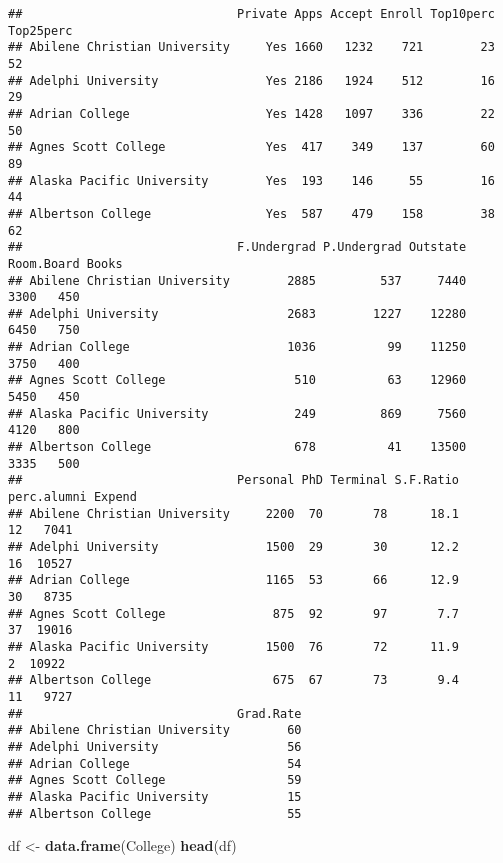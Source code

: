 \documentclass[]{article}
\newenvironment{Shaded}{\begin{snugshade}}{\end{snugshade}}
\newcommand{\KeywordTok}[1]{\textcolor[rgb]{0.13,0.29,0.53}{\textbf{#1}}}
\newcommand{\NormalTok}[1]{#1}
\newcommand{\StringTok}[1]{\textcolor[rgb]{0.31,0.60,0.02}{#1}}
\begin{document}
\begin{verbatim}
##                              Private Apps Accept Enroll Top10perc Top25perc
## Abilene Christian University     Yes 1660   1232    721        23        52
## Adelphi University               Yes 2186   1924    512        16        29
## Adrian College                   Yes 1428   1097    336        22        50
## Agnes Scott College              Yes  417    349    137        60        89
## Alaska Pacific University        Yes  193    146     55        16        44
## Albertson College                Yes  587    479    158        38        62
##                              F.Undergrad P.Undergrad Outstate Room.Board Books
## Abilene Christian University        2885         537     7440       3300   450
## Adelphi University                  2683        1227    12280       6450   750
## Adrian College                      1036          99    11250       3750   400
## Agnes Scott College                  510          63    12960       5450   450
## Alaska Pacific University            249         869     7560       4120   800
## Albertson College                    678          41    13500       3335   500
##                              Personal PhD Terminal S.F.Ratio perc.alumni Expend
## Abilene Christian University     2200  70       78      18.1          12   7041
## Adelphi University               1500  29       30      12.2          16  10527
## Adrian College                   1165  53       66      12.9          30   8735
## Agnes Scott College               875  92       97       7.7          37  19016
## Alaska Pacific University        1500  76       72      11.9           2  10922
## Albertson College                 675  67       73       9.4          11   9727
##                              Grad.Rate
## Abilene Christian University        60
## Adelphi University                  56
## Adrian College                      54
## Agnes Scott College                 59
## Alaska Pacific University           15
## Albertson College                   55
\end{verbatim}

\begin{Shaded}
\begin{Highlighting}[]
\NormalTok{df <-}\StringTok{ }\KeywordTok{data.frame}\NormalTok{(College)}
\KeywordTok{head}\NormalTok{(df)}
\end{Highlighting}
\end{Shaded}
\end{document}
